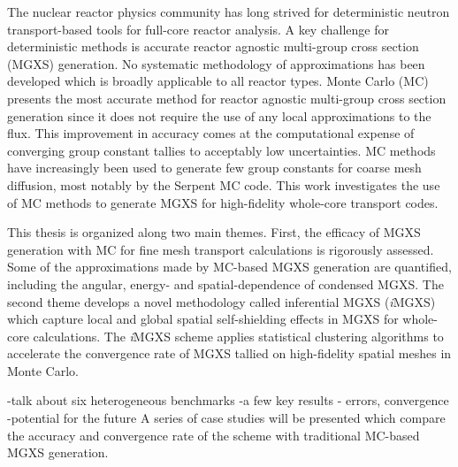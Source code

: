 \begin{abstractpage}

The nuclear reactor physics community has long strived for deterministic neutron transport-based tools for full-core reactor analysis. A key challenge for deterministic methods is accurate reactor agnostic multi-group cross section (MGXS) generation. No systematic methodology of approximations has been developed which is broadly applicable to all reactor types. Monte Carlo (MC) presents the most accurate method for reactor agnostic multi-group cross section generation since it does not require the use of any local approximations to the flux. This improvement in accuracy comes at the computational expense of converging group constant tallies to acceptably low uncertainties. MC methods have increasingly been used to generate few group constants for coarse mesh diffusion, most notably by the Serpent MC code. This work investigates the use of MC methods to generate MGXS for high-fidelity whole-core transport codes.

This thesis is organized along two main themes. First, the efficacy of MGXS generation with MC for fine mesh transport calculations is rigorously assessed. Some of the approximations made by MC-based MGXS generation are quantified, including the angular, energy- and spatial-dependence of condensed MGXS. The second theme develops a novel methodology called inferential MGXS (\textit{i}MGXS) which capture local and global spatial self-shielding effects in MGXS for whole-core calculations. The \textit{i}MGXS scheme applies statistical clustering algorithms to accelerate the convergence rate of MGXS tallied on high-fidelity spatial meshes in Monte Carlo.

-talk about six heterogeneous benchmarks
-a few key results - errors, convergence
-potential for the future
 A series of case studies will be presented which compare the accuracy and convergence rate of the scheme with traditional MC-based MGXS generation.

\end{abstractpage}
